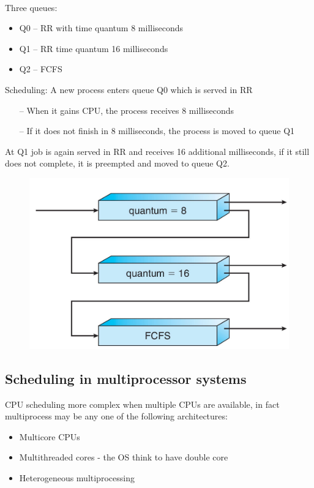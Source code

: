 \paragraph{}
Three queues:
\begin{itemize}
    \item Q0 – RR with time quantum 8 milliseconds
    \item Q1 – RR time quantum 16 milliseconds
    \item Q2 – FCFS
\end{itemize}

\newpage
Scheduling:  A new process enters queue Q0 which is served in RR

\begin{itemize}
    \item[--] When it gains CPU, the process receives 8 milliseconds
    \item[--] If it does not finish in 8 milliseconds, the process is moved to queue Q1
\end{itemize}

At Q1 job is again served in RR and receives 16 additional milliseconds, if it still does not complete, it is preempted and moved to queue Q2.

\begin{figure}[htbp]
    \centering
    \includegraphics[width=0.45\linewidth]{img/multilever_queue.png}
\end{figure}

\subsection{Scheduling in multiprocessor systems}

CPU scheduling more complex when multiple CPUs are available, in fact multiprocess may be any one of the following architectures:

\begin{itemize}
    \item Multicore CPUs
    \item Multithreaded cores - the OS think to have double core 
    \item Heterogeneous multiprocessing
\end{itemize}

